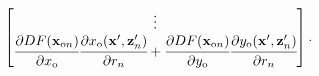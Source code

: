 \begin{align}
\begin{bmatrix}
        \vdots                                                                                                                                     \\
        \cfrac{\partial DF(\mathbf{x}_{\text{o}n})}{\partial x_{\text{o}}}\cfrac{\partial x_{\text{o}}(\mathbf{x}',\mathbf{z}'_n)}{\partial r_n}
        + \cfrac{\partial DF(\mathbf{x}_{\text{o}n})}{\partial y_{\text{o}}}\cfrac{\partial y_{\text{o}}(\mathbf{x}',\mathbf{z}'_n)}{\partial r_n} \\
    \end{bmatrix}.
\end{align}